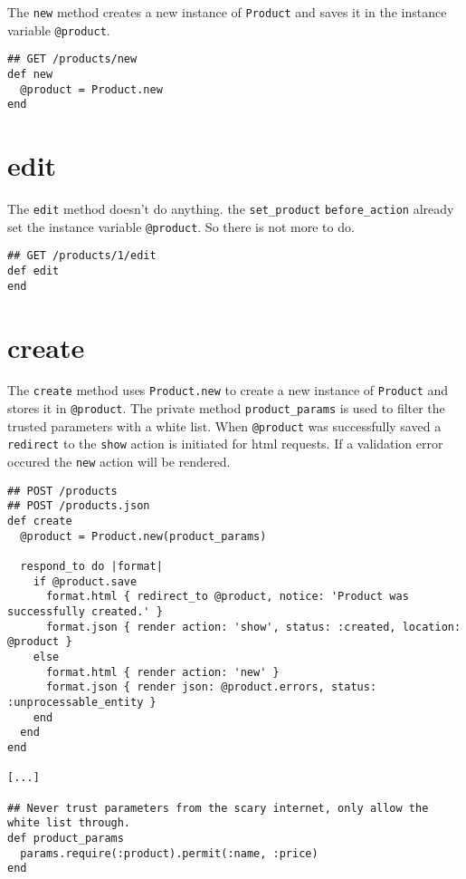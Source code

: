 \documentclass[a4paper]{book}
\begin{document}
The \texttt{new} method creates a new instance of \texttt{Product} and saves it in the instance variable \texttt{@product}.

\begin{shaded}\begin{verbatim}
## GET /products/new
def new
  @product = Product.new
end
\end{verbatim}\end{shaded}

\section{edit}\label{edit}

The \texttt{edit} method doesn't do anything. the \texttt{set\_product} \texttt{before\_action} already set the instance variable \texttt{@product}. So there is not more to do.

\begin{shaded}\begin{verbatim}
## GET /products/1/edit
def edit
end
\end{verbatim}\end{shaded}

\section{create}\label{create-2}

The \texttt{create} method uses \texttt{Product.new} to create a new instance of \texttt{Product} and stores it in \texttt{@product}. The private method \texttt{product\_params} is used to filter the trusted parameters with a white list. When \texttt{@product} was successfully saved a \texttt{redirect} to the \texttt{show} action is initiated for html requests. If a validation error occured the \texttt{new} action will be rendered.

\begin{shaded}\begin{verbatim}
## POST /products
## POST /products.json
def create
  @product = Product.new(product_params)

  respond_to do |format|
    if @product.save
      format.html { redirect_to @product, notice: 'Product was successfully created.' }
      format.json { render action: 'show', status: :created, location: @product }
    else
      format.html { render action: 'new' }
      format.json { render json: @product.errors, status: :unprocessable_entity }
    end
  end
end

[...]

## Never trust parameters from the scary internet, only allow the white list through.
def product_params
  params.require(:product).permit(:name, :price)
end
\end{verbatim}\end{shaded}
\end{document}
